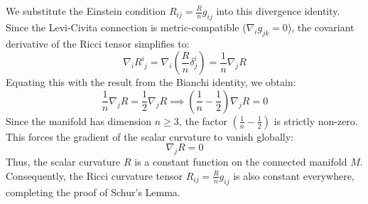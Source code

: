 \begin{solution}
We substitute the Einstein condition $R_{ij} = \frac{R}{n} g_{ij}$ into this divergence identity. Since the Levi-Civita connection is metric-compatible ($\nabla_i g_{jk} = 0$), the covariant derivative of the Ricci tensor simplifies to:
\[ \nabla_i R^i_{\phantom{i}j} = \nabla_i \left( \frac{R}{n} \delta^i_j \right) = \frac{1}{n} \nabla_j R \]
Equating this with the result from the Bianchi identity, we obtain:
\[ \frac{1}{n} \nabla_j R = \frac{1}{2} \nabla_j R \implies \left(\frac{1}{n} - \frac{1}{2}\right) \nabla_j R = 0 \]
Since the manifold has dimension $n \geq 3$, the factor $\left(\frac{1}{n} - \frac{1}{2}\right)$ is strictly non-zero. This forces the gradient of the scalar curvature to vanish globally:
\[ \nabla_j R = 0 \]
Thus, the scalar curvature $R$ is a constant function on the connected manifold $M$. Consequently, the Ricci curvature tensor $R_{ij} = \frac{R}{n} g_{ij}$ is also constant everywhere, completing the proof of Schur's Lemma.
\end{solution}
